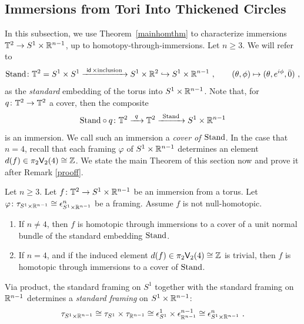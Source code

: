 \subsection{Immersions from Tori Into Thickened Circles}
\label{extexample}
In this subsection, we use Theorem~\ref{mainhomthm} to characterize immersions $\mathbb T^2 \to S^1 \times \mathbb R^{n-1}$, up to homotopy-through-immersions.
Let $n \geq 3$.
We will refer to
\begin{equation}
{\rm Stand}
\colon
\mathbb T^{2} = S^1\times S^1 \xrightarrow{~\operatorname{\sf id} \times {\rm inclusion}~}
S^1 \times \mathbb R^2
\hookrightarrow
S^1 \times \mathbb R^{n-1}
~, \qquad (\theta, \phi) \mapsto (\theta, e^{i\phi}, \bar{0})
~,
\end{equation}
as the \emph{standard} embedding of the torus into $S^1 \times \mathbb R^{n-1}$.
Note that, for $q \colon \mathbb T^2 \to \mathbb T^2$ a cover, then the composite
\[
{\rm Stand}\circ q
\colon
\mathbb T^2
\xrightarrow{~q~}
\mathbb T^2
\xrightarrow{~{\rm Stand~}}
S^1\times \mathbb R^{n-1}
\]
is an immersion.
We call such an immersion a \emph{cover of ${\rm Stand}$}.
In the case that $n=4$, recall that each framing $\varphi$ of $S^1\times \mathbb R^{n-1}$ determines an element $d(f) \in \pi_2\mathsf V_2(4)\cong \mathbb Z$. We state the main Theorem of this section now and prove it after Remark \ref{prooff}.
\begin{theorem}
\label{t8uni}
Let $n\geq 3$.
Let $f\colon \mathbb T^2 \to S^1\times \mathbb R^{n-1}$ be an immersion from a torus.
Let $\varphi\colon \tau_{S^1 \times \mathbb R^{n-1}}  \cong \epsilon^n_{S^1\times \mathbb R^{n-1}}$ be a framing.
Assume $f$ is not null-homotopic.
\begin{enumerate}

\item
If $n \neq 4$, then $f$ is homotopic through immersions to a cover of a unit normal bundle of the standard embedding ${\rm Stand}$.  

\item
If $n=4$, and if the induced element $d(f) \in \pi_2\mathsf V_2(4) \cong \mathbb Z$ is trivial, then $f$ is homotopic through immersions to a cover of ${\rm Stand}$. 

\end{enumerate}
\end{theorem}


Via product, the standard framing on $S^1$ together with the standard framing on $\mathbb R^{n-1}$ determines a \emph{standard framing} on $S^1\times \mathbb R^{n-1}$:
\[
\tau_{S^1 \times \mathbb R^{n-1}}
\cong
\tau_{S^1}
\times
\tau_{\mathbb R^{n-1}}
\cong
\epsilon^1_{S^1}
\times
\epsilon^{n-1}_{\mathbb R^{n-1}}
\cong
\epsilon^n_{S^1\times\mathbb R^{n-1}}
~.
\]


